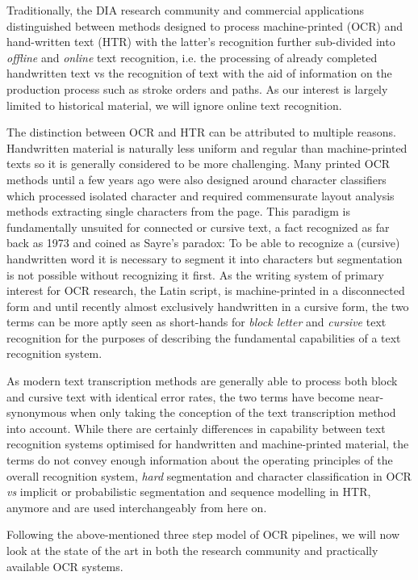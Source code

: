 Traditionally, the DIA research community and commercial applications
distinguished between methods designed to process machine-printed (OCR) and
hand-written text (HTR) with the latter's recognition further sub-divided into
\emph{offline} and \emph{online} text recognition, i.e. the processing of
already completed handwritten text vs the recognition of text with the aid of
information on the production process such as stroke orders and paths. As our
interest is largely limited to historical material, we will ignore online text
recognition.

The distinction between OCR and HTR can be attributed to multiple reasons.
Handwritten material is naturally less uniform and regular than machine-printed
texts so it is generally considered to be more challenging. Many printed OCR
methods until a few years ago were also designed around character classifiers
which processed isolated character and required commensurate layout analysis
methods extracting single characters from the page. This paradigm is
fundamentally unsuited for connected or cursive text, a fact recognized as far
back as 1973 \cite{sayre1973machine} and coined as Sayre's paradox: To be able
to recognize a (cursive) handwritten word it is necessary to segment it into
characters but segmentation is not possible without recognizing it first. As
the writing system of primary interest for OCR research, the Latin script, is
machine-printed in a disconnected form and until recently almost exclusively
handwritten in a cursive form, the two terms can be more aptly seen as
short-hands for \emph{block letter} and \emph{cursive} text recognition for the
purposes of describing the fundamental capabilities of a text recognition
system.

As modern text transcription methods are generally able to process both block
and cursive text with identical error rates, the two terms have become
near-synonymous when only taking the conception of the text transcription
method into account. While there are certainly differences in capability
between text recognition systems optimised for handwritten and machine-printed
material, the terms do not convey enough information about the operating
principles of the overall recognition system, \emph{hard} segmentation and
character classification in OCR \emph{vs} implicit or probabilistic
segmentation and sequence modelling in HTR, anymore and are used
interchangeably from here on.

Following the above-mentioned three step model of OCR pipelines, we will now
look at the state of the art in both the research community and practically
available OCR systems.


